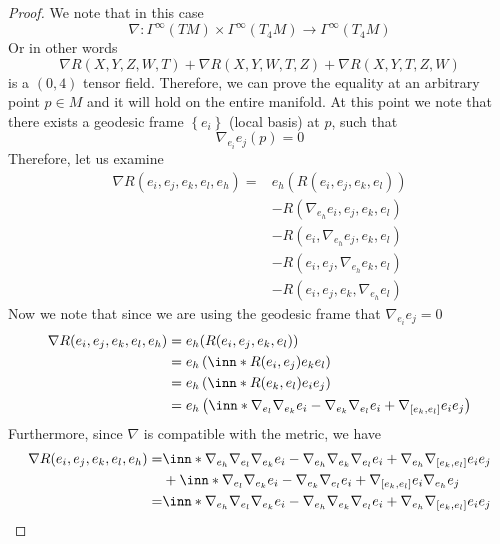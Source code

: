 \documentclass[a4paper]{article}
\begin{document}
\begin{proof}
  We note that in this case
  \[
    \nabla: \Gamma^{\infty}(TM) \times \Gamma^{\infty}(T_4M) \rightarrow \Gamma^{\infty}(T_4M)
  \]
  Or in other words
  \[
  \nabla R(X,Y,Z,W,T) + \nabla R(X,Y,W,T,Z) + \nabla R(X,Y,T,Z,W)
  \]
  is a $(0,4)$ tensor field. Therefore, we can prove the equality at an arbitrary point $p \in M$ and it will hold on the entire manifold. At this point we note that there exists a geodesic frame $\left\{ e_i \right\}$ (local basis) at $p$, such that
  \[
    \nabla_{e_i} e_j(p) = 0
  \]
  Therefore, let us examine
  \[
    \begin{aligned}
      \nabla R(e_i, e_j, e_k, e_l, e_h) =& e_h( R(e_i, e_j, e_k, e_l))   \\
                                         &- R(\nabla_{e_h}e_i, e_j, e_k, e_l) \\
                                         &- R(e_i, \nabla_{e_h}e_j, e_k, e_l) \\
                                         &- R(e_i, e_j, \nabla_{e_h}e_k, e_l) \\
                                         &- R(e_i, e_j, e_k, \nabla_{e_h}e_l)
    \end{aligned}
  \]
  Now we note that since we are using the geodesic frame that $\nabla_{e_i}e_j = 0$
  \[
    \begin{aligned}
      \nabla R(e_i, e_j, e_k, e_l, e_h) &= e_h( R(e_i, e_j, e_k, e_l)) \\ 
                                        &= e_h \left( \inn*{R(e_i, e_j)e_k}{e_l} \right) \\
                                        &= e_h \left( \inn*{R(e_k, e_l)e_i}{e_j} \right) \\
                                        &= e_h \left( \inn*{\nabla_{e_l}\nabla_{e_k}e_i - \nabla_{e_k}\nabla_{e_l}e_i + \nabla_{[e_k,e_l]}e_i}{e_j}\right)
    \end{aligned}
  \]
  Furthermore, since $\nabla$ is compatible with the metric, we have
  \[
    \begin{aligned}
    \nabla R(e_i,e_j,e_k,e_l,e_h) =& \inn*{\nabla_{e_h}\nabla_{e_l}\nabla_{e_k}e_i - \nabla_{e_h}\nabla_{e_k}\nabla_{e_l}e_i + \nabla_{e_h}\nabla_{[e_k,e_l]}e_i}{e_j} \\
                                   &+ \inn*{\nabla_{e_l}\nabla_{e_k}e_i - \nabla_{e_k}\nabla_{e_l}e_i + \nabla_{[e_k,e_l]}e_i}{\nabla_{e_h}e_j} \\
                                    =& \inn*{\nabla_{e_h}\nabla_{e_l}\nabla_{e_k}e_i - \nabla_{e_h}\nabla_{e_k}\nabla_{e_l}e_i + \nabla_{e_h}\nabla_{[e_k,e_l]}e_i}{e_j} \\

\end{aligned}\]
\end{proof}
\end{document}
